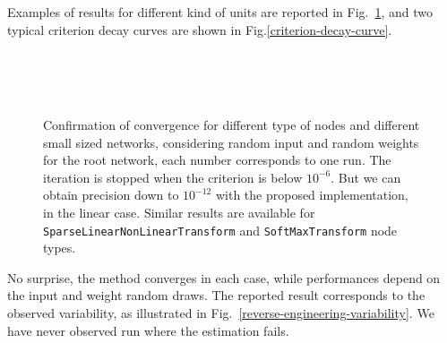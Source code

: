 Examples of results for different kind of units are reported in Fig.~\ref{reverse-engineering}, and two typical criterion decay curves are shown in Fig.\ref{criterion-decay-curve}. 

\begin{figure}[!ht]
  \begin{center}{\small
     \\
    ~\\
     \\
  }\end{center}
  \caption{Confirmation of convergence for different type of nodes and different small sized networks, considering random input and random weights for the root network, each number corresponds to one run. The iteration is stopped when the criterion is below $10^{-6}$. But we can obtain precision down to $10^{-12}$ with the proposed implementation, in the linear case. Similar results are available for {\tt SparseLinearNonLinearTransform} and {\tt SoftMaxTransform} node types.}
  \label{reverse-engineering}
\end{figure}

No surprise, the method converges in each case, while performances depend on the input and weight random draws. The reported result corresponds to the observed variability, as illustrated in Fig.~\ref{reverse-engineering-variability}. We have never observed run where the estimation fails.


